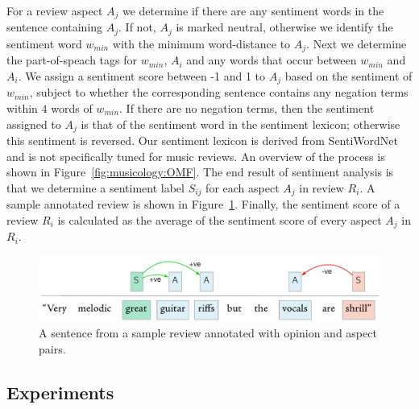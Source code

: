 For a review aspect $A_{j}$ we determine if there are any sentiment words in the sentence containing $A_{j}$. If not, $A_{j}$ is marked neutral, otherwise we identify the sentiment word $w_{min}$ with the minimum word-distance to $A_j$. Next we determine the part-of-speach tags for $w_{min}$, $A_i$ and any words that occur between $w_{min}$ and $A_i$. 
We assign a sentiment score between -1 and 1 to $A_j$ based on the sentiment of $w_{min}$, subject to whether the corresponding sentence contains any negation terms within $4$ words of $w_{min}$. If there are no negation terms, then the sentiment assigned to $A_j$ is that of the sentiment word in the sentiment lexicon; otherwise this sentiment is reversed. Our sentiment lexicon is derived from SentiWordNet \citep{esuli2006sentiwordnet} and is not specifically tuned for music reviews.
An overview of the process is shown in Figure~\ref{fig:musicology:OMF}. The end result of sentiment analysis is that we determine a sentiment label $S_{ij}$ for each aspect $A_j$ in review $R_i$. A sample annotated review is shown in Figure~\ref{fig:musicology:annotatedreview}.
Finally, the sentiment score of a review $R_i$ is calculated as the average of the sentiment score of every aspect $A_j$ in $R_i$.

\begin{figure}[h]
\includegraphics[width=\columnwidth]{ch05_musicology_pics/annotation_sample2}
\caption{A sentence from a sample review annotated with opinion and aspect pairs.}
\label{fig:musicology:annotatedreview}
\end{figure}

\subsection{Experiments}
\label{sec:musicology:experiments}

